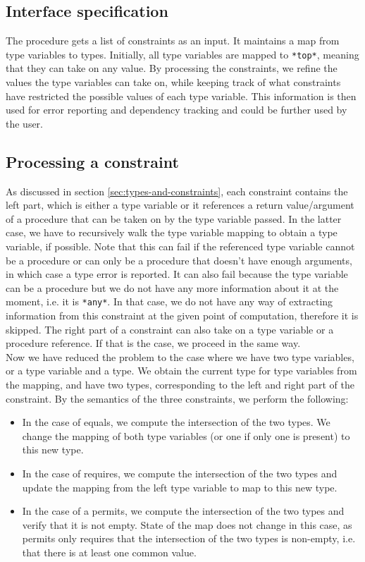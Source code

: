 \documentclass[a4paper]{article}
\begin{document}
\subsection{Interface specification}
The procedure gets a list of constraints as an input.
It maintains a map from type variables to types.
Initially, all type variables are mapped to \texttt{*top*},
meaning that they can take on any value.
By processing the constraints, we refine the values the type variables can take on,
while keeping track of what constraints have restricted the possible values of each
type variable.
This information is then used for error reporting and dependency tracking and could be
further used by the user.

\subsection{Processing a constraint}

As discussed in section \ref{sec:types-and-constraints},
each constraint contains the left part, which is either a type variable
or it references a return value/argument of a procedure that can be taken on by the
type variable passed.
In the latter case, we have to recursively walk the type variable
mapping to obtain a type variable, if possible.
Note that this can fail if the referenced type variable cannot be a procedure
or can only be a procedure that doesn't have enough arguments, in which
case a type error is reported.
It can also fail because the type variable can be a procedure
but we do not have any more information about it at the moment, i.e. it is 
\texttt{*any*}.
In that case, we do not have any way of extracting information from this constraint
at the given point of computation, therefore it is skipped.
The right part of a constraint can also take on a type variable or a procedure reference.
If that is the case, we proceed in the same way.\\

Now we have reduced the problem to the case where we have two type variables,
or a type variable and a type.
We obtain the current type for type variables from the mapping,
and have two types, corresponding to the left and right part of the constraint.
By the semantics of the three constraints, we perform the following:
\begin{itemize}
\item
In the case of equals, we compute the intersection of the two
types.
We change the mapping of both type variables (or one if only one is present)
to this new type.
\item
In the case of requires, we compute the intersection of the two types
and update the mapping from the left type variable to map to this new type.
\item
In the case of a permits, we compute the intersection of the two types and verify
that it is not empty.
State of the map does not change in this case, as permits only requires that the
intersection of the two types is non-empty, i.e. that there is at least one common value.
\end{itemize}
\end{document}

